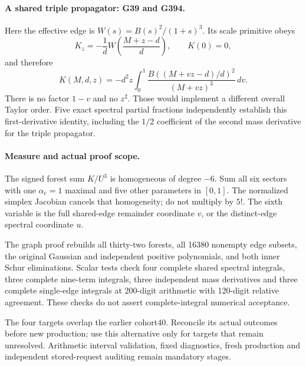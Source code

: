 \documentclass[11pt]{article}
\begin{document}
\paragraph{A shared triple propagator: G39 and G394.}
Here the effective edge is \(W(s)=B(s)^2/(1+s)^3\). Its scale primitive obeys
\[
 K_z=-\frac1d W\!\left(\frac{M+z-d}{d}\right),\qquad K(0)=0,
\]
and therefore
\[
 K(M,d,z)=-d^2z\int_0^1
 \frac{B((M+vz-d)/d)^2}{(M+vz)^3}\,dv .
\]
There is no factor \(1-v\) and no \(z^2\). Those would implement a different overall Taylor order. Five exact spectral partial fractions independently establish this first-derivative identity, including the \(1/2\) coefficient of the second mass derivative for the triple propagator.

\paragraph{Measure and actual proof scope.}
The signed forest sum \(K/U^3\) is homogeneous of degree \(-6\). Sum all six sectors with one \(\alpha_e=1\) maximal and five other parameters in \([0,1]\). The normalized simplex Jacobian cancels that homogeneity; do not multiply by \(5!\). The sixth variable is the full shared-edge remainder coordinate \(v\), or the distinct-edge spectral coordinate \(u\).

The graph proof rebuilds all thirty-two forests, all 16380 nonempty edge subsets, the original Gaussian and independent positive polynomials, and both inner Schur eliminations. Scalar tests check four complete shared spectral integrals, three complete nine-term integrals, three independent mass derivatives and three complete single-edge integrals at 200-digit arithmetic with 120-digit relative agreement. These checks do not assert complete-integral numerical acceptance.

The four targets overlap the earlier cohort40. Reconcile its actual outcomes before new production; use this alternative only for targets that remain unresolved. Arithmetic interval validation, fixed diagnostics, fresh production and independent stored-request auditing remain mandatory stages.
\end{document}
